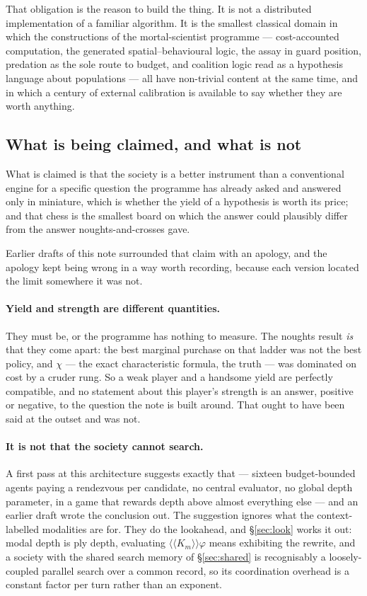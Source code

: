 \documentclass[11pt,a4paper]{article}
\theoremstyle{plain}
\theoremstyle{definition}
\theoremstyle{remark}
\newcommand{\KKmod}[1]{\langle\!\langle K_{#1}\rangle\!\rangle}
\begin{document}
That obligation is the reason to build the thing. It is not a distributed
implementation of a familiar algorithm. It is the smallest classical domain in
which the constructions of the mortal-scientist programme --- cost-accounted
computation, the generated spatial--behavioural logic, the assay in guard
position, predation as the sole route to budget, and coalition logic read as a
hypothesis language about populations --- all have non-trivial content at the
same time, and in which a century of external calibration is available to say
whether they are worth anything.

\subsection{What is being claimed, and what is not}
\label{sec:claim}

What is claimed is that the society is a better instrument than a conventional
engine for a specific question the programme has already asked and answered only
in miniature, which is whether the yield of a hypothesis is worth its price; and
that chess is the smallest board on which the answer could plausibly differ from
the answer noughts-and-crosses gave.

Earlier drafts of this note surrounded that claim with an apology, and the
apology kept being wrong in a way worth recording, because each version located
the limit somewhere it was not.

\paragraph{Yield and strength are different quantities.} They must be, or the
programme has nothing to measure. The noughts result \emph{is} that they come
apart: the best marginal purchase on that ladder was not the best policy, and
$\chi$ --- the exact characteristic formula, the truth --- was dominated on
cost by a cruder rung. So a weak player and a handsome yield are perfectly
compatible, and no statement about this player's strength is an answer, positive
or negative, to the question the note is built around. That ought to have been
said at the outset and was not.

\paragraph{It is not that the society cannot search.} A first pass at this
architecture suggests exactly that --- sixteen budget-bounded agents paying a
rendezvous per candidate, no central evaluator, no global depth parameter, in a
game that rewards depth above almost everything else --- and an earlier draft
wrote the conclusion out. The suggestion ignores what the context-labelled
modalities are for. They do the lookahead, and \S\ref{sec:look} works it out:
modal depth is ply depth, evaluating $\KKmod{m}\varphi$ means exhibiting the
rewrite, and a society with the shared search memory of \S\ref{sec:shared} is
recognisably a loosely-coupled parallel search over a common record, so its
coordination overhead is a constant factor per turn rather than an exponent.
\end{document}
